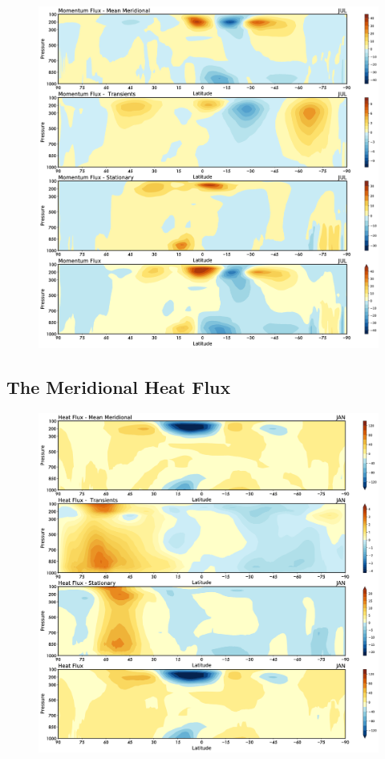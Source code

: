 \begin{figure}
\centering
\includegraphics[width = .7 \textwidth]{figs/GD/JULUVFlux.png}
\caption{}\label{}
\end{figure}

\subsection{The Meridional Heat Flux}\label{the-meridional-heat-flux}

\begin{figure}
\centering
\includegraphics[width = .7 \textwidth]{figs/GD/JANTVFlux.png}
\caption{}\label{}
\end{figure}

